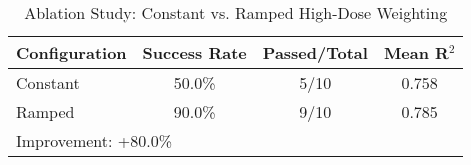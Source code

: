 
\begin{table}[htbp]
\centering
\caption{Ablation Study: Constant vs. Ramped High-Dose Weighting}
\label{tab:exp1_ramp_ablation}
\begin{tabular}{lccc}
\hline
\textbf{Configuration} & \textbf{Success Rate} & \textbf{Passed/Total} & \textbf{Mean R$^2$} \\
\hline
Constant & 50.0\% & 5/10 & 0.758 \\
Ramped & 90.0\% & 9/10 & 0.785 \\
\hline
\multicolumn{4}{l}{\small Improvement: +80.0\%}
\end{tabular}
\end{table}
